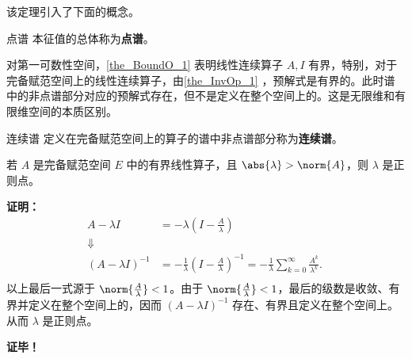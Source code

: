 该定理引入了下面的概念。
\begin{definition}{点谱}
本征值的总体称为\textbf{点谱}。
\end{definition}

对第一可数性空间，\autoref{the_BoundO_1} 表明线性连续算子 $A,I$ 有界，特别，对于完备赋范空间上的线性连续算子，由\autoref{the_InvOp_1} ，预解式是有界的。此时谱中的非点谱部分对应的预解式存在，但不是定义在整个空间上的。这是无限维和有限维空间的本质区别。

\begin{definition}{连续谱}
定义在完备赋范空间上的算子的谱中非点谱部分称为\textbf{连续谱}。
\end{definition}



\begin{theorem}{}
若 $A$ 是完备赋范空间 $E$ 中的有界线性算子，且 $\abs{\lambda}>\norm{A}$，则 $\lambda$ 是正则点。
\end{theorem}

\textbf{证明：} 
\begin{equation}
\begin{aligned}
A-\lambda I&=-\lambda(I-\frac{A}{\lambda})\\
\Downarrow\\
(A-\lambda I)^{-1}&=-\frac{1}{\lambda}(I-\frac{A}{\lambda})^{-1}=-\frac{1}{\lambda}\sum_{k=0}^\infty\frac{A^k}{\lambda^k}.\\
\end{aligned}~
\end{equation}
以上最后一式源于 $\norm{\frac{A}{\lambda}}<1$。由于 $\norm{\frac{A}{\lambda}}<1$，最后的级数是收敛、有界并定义在整个空间上的，因而 $(A-\lambda I)^{-1}$ 存在、有界且定义在整个空间上。从而 $\lambda$ 是正则点。


\textbf{证毕！}
